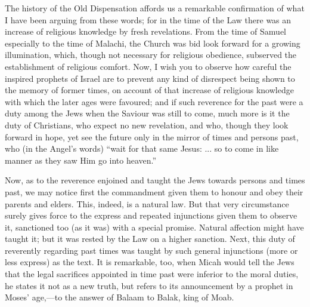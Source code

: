 The history of the Old Dispensation affords us a remarkable
confirmation of what I have been arguing from these words; for in the
time of the Law there was an increase of religious knowledge by fresh
revelations. From the time of Samuel especially to the time of
Malachi, the Church was bid look forward for a growing illumination,
which, though not necessary for religious obedience, subserved the
establishment of religious comfort. Now, I wish you to observe how
careful the inspired prophets of Israel are to prevent any kind of
disrespect being shown to the memory of former times, on account of
that increase of religious knowledge with which the later ages were
favoured; and if such reverence for the past were a duty among the
Jews when the Saviour was still to come, much more is it the duty of
Christians, who expect no new revelation, and who, though they look
forward in hope, yet see the future only in the mirror of times and
persons past, who (in the Angel's words) ``wait for that same
Jesus: ... so to come in like manner as they saw Him go into
heaven.''

Now, as to the reverence enjoined and taught the Jews towards
persons and times past, we may notice first the commandment given them
to honour and obey their parents and elders. This, indeed, is a
natural law. But that very circumstance surely gives force to the
express and repeated injunctions given them to observe it, sanctioned
too (as it was) with a special promise. Natural affection might have
taught it; but it was rested by the Law on a higher sanction. Next,
this duty of reverently regarding past times was taught by such
general injunctions (more or less express) as the text. It is
remarkable, too, when Micah would tell the Jews that the legal
sacrifices appointed in time past were inferior to the moral duties,
he states it not as a new truth, but refers to its announcement by a
prophet in Moses' age,—to the answer of Balaam to Balak, king of
Moab.

